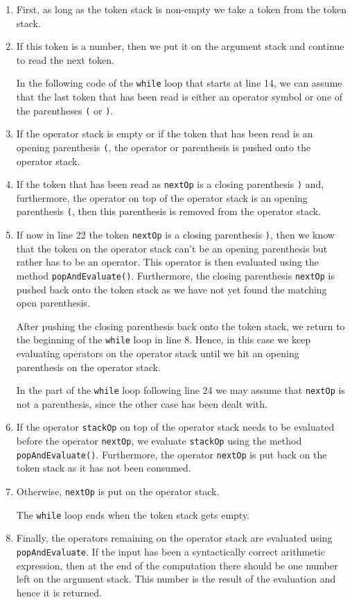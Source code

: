 \begin{enumerate}
\item First, as long as the token stack is non-empty we take a token from the token stack.
\item If this token is a number, then we put it on the argument stack and continue to read the next token.
  
      In the following code of the \texttt{while} loop that starts at line 14, we can assume that
      the last token that has been read is either an operator symbol
      or one of the parentheses \texttt{(} or \texttt{)}. 
\item If the operator stack is empty or if the token that has been read is an opening parenthesis
      \texttt{(}, the operator or parenthesis is pushed onto the operator stack.
\item If the  token that has been read as \texttt{nextOp} is a closing parenthesis 
      \texttt{)} and, furthermore, the operator on top of the operator stack is
      an opening parenthesis \texttt{(}, then this parenthesis is removed from the
      operator stack.
\item If now in line 22 the token \texttt{nextOp} is a closing parenthesis
      \texttt{)}, then we know that the token on the operator stack
      can't be an opening parenthesis but rather has to be an operator.
      This operator is then evaluated using the method \texttt{popAndEvaluate()}.
      Furthermore, the closing parenthesis \texttt{nextOp} is pushed back onto the
      token stack as we have not yet found the matching open parenthesis.

      After pushing the closing parenthesis back onto the token stack, we return to the beginning of
      the \texttt{while} loop in line 8.  Hence, in this case we keep evaluating operators
      on the operator stack until we hit an opening parenthesis on the operator stack.

      In the part of the \texttt{while} loop following line 24 we may assume that 
      \texttt{nextOp} is not a parenthesis, since the other case  has been dealt with.

\item If the operator \texttt{stackOp} on top of the operator stack needs to be evaluated before the operator
      \texttt{nextOp}, we evaluate \texttt{stackOp} using the method \texttt{popAndEvaluate()}.
      Furthermore, the operator \texttt{nextOp} is put back on the token stack 
      as it has not been consumed.
\item Otherwise, \texttt{nextOp} is put on the operator stack.

      The \texttt{while} loop ends when the token stack gets empty.
\item Finally, the operators remaining on the operator stack are evaluated using
      \texttt{popAndEvaluate}.  If the input has been a syntactically correct arithmetic expression,
      then at the end of the computation there should be one number left on the argument stack.
      This number is the result of the evaluation and hence it is returned.
\end{enumerate}


